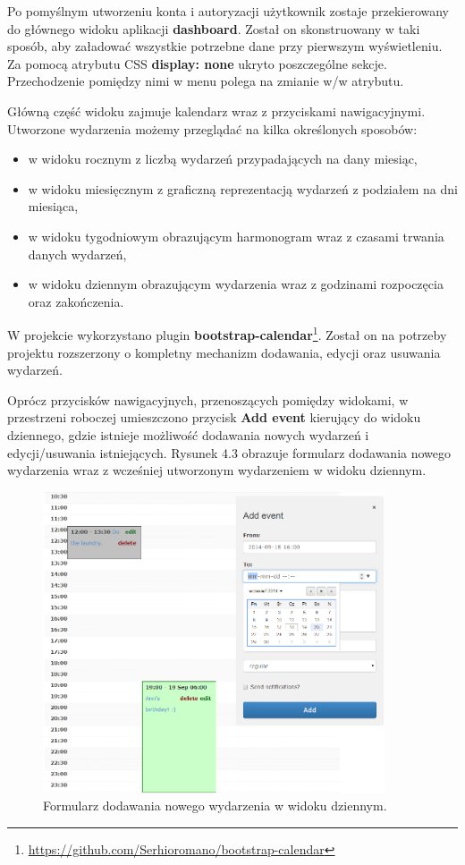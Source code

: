 Po pomyślnym utworzeniu konta i autoryzacji użytkownik zostaje przekierowany do głównego widoku aplikacji \textbf{dashboard}. Został on skonstruowany w taki sposób, aby załadować wszystkie potrzebne dane przy pierwszym wyświetleniu. Za pomocą atrybutu CSS \textbf{display: none} ukryto poszczególne sekcje. Przechodzenie pomiędzy nimi w menu polega na zmianie w/w atrybutu.

Główną część widoku zajmuje kalendarz wraz z przyciskami nawigacyjnymi. Utworzone wydarzenia możemy przeglądać na kilka określonych sposobów:

\begin{itemize}
\setlength\itemsep{1em}
\item w widoku rocznym z liczbą wydarzeń przypadających na dany miesiąc,
\item w widoku miesięcznym z graficzną reprezentacją wydarzeń z podziałem na dni miesiąca,
\item w widoku tygodniowym obrazującym harmonogram wraz z czasami trwania danych wydarzeń,
\item w widoku dziennym obrazującym wydarzenia wraz z godzinami rozpoczęcia oraz zakończenia.
\end{itemize}

W projekcie wykorzystano plugin \textbf{bootstrap-calendar}\footnote{\url{https://github.com/Serhioromano/bootstrap-calendar}}. Został on na potrzeby projektu rozszerzony o kompletny mechanizm dodawania, edycji oraz usuwania wydarzeń.

Oprócz przycisków nawigacyjnych, przenoszących pomiędzy widokami, w przestrzeni roboczej umieszczono przycisk \textbf{Add event} kierujący do widoku dziennego, gdzie istnieje możliwość dodawania nowych wydarzeń i edycji/usuwania istniejących. Rysunek 4.3 obrazuje formularz dodawania nowego wydarzenia wraz z wcześniej utworzonym wydarzeniem w widoku dziennym.

\begin{figure}[H]
\centering
\includegraphics[width=0.9\textwidth]{add_event.png}
\caption{Formularz dodawania nowego wydarzenia w widoku dziennym.}
\end{figure}

